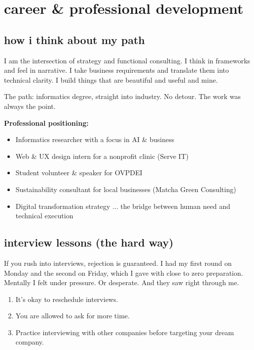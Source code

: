 \documentclass[12pt, letterpaper]{article}
\newenvironment{jadequote}{%
  \begin{mdframed}[backgroundcolor=soft, linecolor=moxie, linewidth=1pt,
    innerleftmargin=10pt, innerrightmargin=10pt,
    innertopmargin=8pt, innerbottommargin=8pt]
  \itshape
}{%
  \end{mdframed}
}
\begin{document}
\section{career \& professional development}

\subsection{how i think about my path}

I am the intersection of strategy and functional consulting. I think in frameworks and feel in narrative. I take business requirements and translate them into technical clarity. I build things that are beautiful and useful and mine.

The path: informatics degree, straight into industry. No detour. The work was always the point.

\textbf{Professional positioning:}
\begin{itemize}
  \item Informatics researcher with a focus in AI \& business
  \item Web \& UX design intern for a nonprofit clinic (Serve IT)
  \item Student volunteer \& speaker for OVPDEI
  \item Sustainability consultant for local businesses (Matcha Green Consulting)
  \item Digital transformation strategy ... the bridge between human need and technical execution
\end{itemize}

\subsection{interview lessons (the hard way)}

\begin{jadequote}
If you rush into interviews, rejection is guaranteed. I had my first round on Monday and the second on Friday, which I gave with close to zero preparation. Mentally I felt under pressure. Or desperate. And they saw right through me.
\end{jadequote}

\begin{enumerate}[leftmargin=*, label=\arabic*.]
  \item It's okay to reschedule interviews.
  \item You are allowed to ask for more time.
  \item Practice interviewing with other companies before targeting your dream company.
\end{enumerate}
\end{document}

